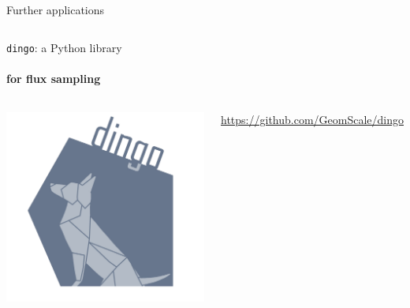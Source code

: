 \documentclass{beamer}
\begin{document}
\begin{frame}{Further applications}
\begin{singlespace}
\begin{columns}[onlytextwidth]
         \end{columns}
      \end{singlespace}
   \end{frame}


   \begin{frame}{\texttt{dingo}: a Python library }
      \framesubtitle{for flux sampling}


      \begin{columns}[onlytextwidth]

            \includegraphics[scale=0.1]{ ../met_nets/resources//dingo5_transparent.png}
         

            \href{https://github.com/GeomScale/dingo}{https://github.com/GeomScale/dingo}





\end{columns}
\end{frame}
\end{document}
